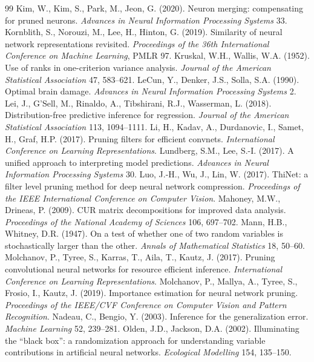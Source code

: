 \documentclass[11pt,a4paper]{article}
\theoremstyle{remark}\newtheorem{remark}{Remark}
\begin{document}
\begin{thebibliography}{99}
 Kim, W., Kim, S., Park, M., Jeon, G. (2020). Neuron merging: compensating for pruned neurons. \emph{Advances in Neural Information Processing Systems} 33.
 Kornblith, S., Norouzi, M., Lee, H., Hinton, G. (2019). Similarity of neural network representations revisited. \emph{Proceedings of the 36th International Conference on Machine Learning}, PMLR 97.
 Kruskal, W.H., Wallis, W.A. (1952). Use of ranks in one-criterion variance analysis. \emph{Journal of the American Statistical Association} 47, 583--621.
 LeCun, Y., Denker, J.S., Solla, S.A. (1990). Optimal brain damage. \emph{Advances in Neural Information Processing Systems} 2.
 Lei, J., G'Sell, M., Rinaldo, A., Tibshirani, R.J., Wasserman, L. (2018). Distribution-free predictive inference for regression. \emph{Journal of the American Statistical Association} 113, 1094--1111.
 Li, H., Kadav, A., Durdanovic, I., Samet, H., Graf, H.P. (2017). Pruning filters for efficient convnets. \emph{International Conference on Learning Representations}.
 Lundberg, S.M., Lee, S.-I. (2017). A unified approach to interpreting model predictions. \emph{Advances in Neural Information Processing Systems} 30.
 Luo, J.-H., Wu, J., Lin, W. (2017). ThiNet: a filter level pruning method for deep neural network compression. \emph{Proceedings of the IEEE International Conference on Computer Vision}.
 Mahoney, M.W., Drineas, P. (2009). CUR matrix decompositions for improved data analysis. \emph{Proceedings of the National Academy of Sciences} 106, 697--702.
 Mann, H.B., Whitney, D.R. (1947). On a test of whether one of two random variables is stochastically larger than the other. \emph{Annals of Mathematical Statistics} 18, 50--60.
 Molchanov, P., Tyree, S., Karras, T., Aila, T., Kautz, J. (2017). Pruning convolutional neural networks for resource efficient inference. \emph{International Conference on Learning Representations}.
 Molchanov, P., Mallya, A., Tyree, S., Frosio, I., Kautz, J. (2019). Importance estimation for neural network pruning. \emph{Proceedings of the IEEE/CVF Conference on Computer Vision and Pattern Recognition}.
 Nadeau, C., Bengio, Y. (2003). Inference for the generalization error. \emph{Machine Learning} 52, 239--281.
 Olden, J.D., Jackson, D.A. (2002). Illuminating the ``black box'': a randomization approach for understanding variable contributions in artificial neural networks. \emph{Ecological Modelling} 154, 135--150.

\end{thebibliography}
\end{document}
